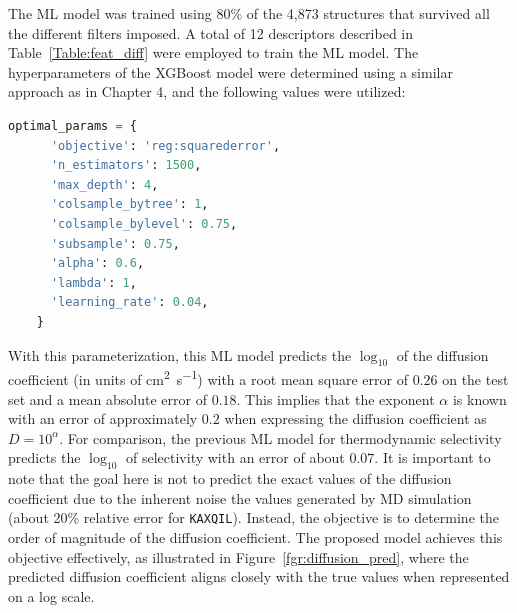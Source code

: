 \documentclass[main]{subfiles}
\begin{document}
The ML model was trained using {80\%} of the 4,873 structures that survived all the different filters imposed. A total of 12 descriptors described in Table~\ref{Table:feat_diff} were employed to train the ML model. The hyperparameters of the XGBoost model were determined using a similar approach as in Chapter 4, and the following values were utilized:

\begin{lstlisting}[language=Python]
  optimal_params = {
      'objective': 'reg:squarederror',
      'n_estimators': 1500,
      'max_depth': 4,
      'colsample_bytree': 1,
      'colsample_bylevel': 0.75,
      'subsample': 0.75,
      'alpha': 0.6,
      'lambda': 1,
      'learning_rate': 0.04,
    }
\end{lstlisting}

With this parameterization, this ML model predicts the $\log_{10}$ of the diffusion coefficient (in units of \si{\square\cm\per\s}) with a root mean square error of $0.26$ on the test set and a mean absolute error of $0.18$. This implies that the exponent $\alpha$ is known with an error of approximately $0.2$ when expressing the diffusion coefficient as $D = 10^{\alpha}$. For comparison, the previous ML model for thermodynamic selectivity predicts the $\log_{10}$ of selectivity with an error of about $0.07$. It is important to note that the goal here is not to predict the exact values of the diffusion coefficient due to the inherent noise the values generated by MD simulation (about {20\% relative error for \texttt{KAXQIL}}). Instead, the objective is to determine the order of magnitude of the diffusion coefficient. The proposed model achieves this objective effectively, as illustrated in Figure~\ref{fgr:diffusion_pred}, where the predicted diffusion coefficient aligns closely with the true values when represented on a log scale.
\end{document}
